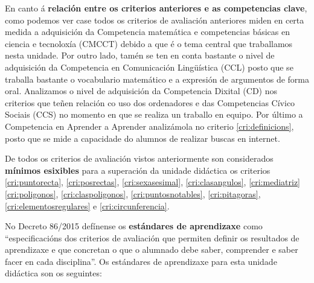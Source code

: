 En canto á \textbf{relación entre os criterios anteriores e as competencias clave}, como podemos ver case todos os criterios de avaliación anteriores miden en certa medida a adquisición da Competencia matemática e competencias básicas en ciencia e tecnoloxía (CMCCT) debido a que é o tema central que traballamos nesta unidade. Por outro lado, tamén se ten en conta bastante o nivel de adquisición da Competencia en Comunicación Lingüística (CCL) posto que se traballa bastante o vocabulario matemático e a expresión de argumentos de forma oral. Analizamos o nivel de adquisición da Competencia Dixital (CD) nos criterios que teñen relación co uso dos ordenadores e das Competencias Cívico Sociais (CCS) no momento en que se realiza un traballo en equipo. Por último a Competencia en Aprender a Aprender analizámola no criterio \ref{cri:definicions}, posto que se mide a capacidade do alumnos de realizar buscas en internet.

De todos os criterios de avaliación vistos anteriormente son considerados \textbf{mínimos esixibles} para a superación da unidade didáctica os criterios \ref{cri:puntorecta}, \ref{cri:posrectas}, \ref{cri:sexasesimal}, \ref{cri:clasangulos}, \ref{cri:mediatriz} \ref{cri:poligonos}, \ref{cri:claspoligonos}, \ref{cri:puntosnotables}, \ref{cri:pitagoras}, \ref{cri:elementosregulares} e \ref{cri:circunferencia}.

No Decreto 86/2015 defínense os \textbf{estándares de aprendizaxe} como ``especificacións dos criterios de avaliación que permiten definir os resultados de aprendizaxe e que concretan o que o alumnado debe saber, comprender e saber facer en cada disciplina''. Os estándares de aprendizaxe para esta unidade didáctica son os seguintes:


